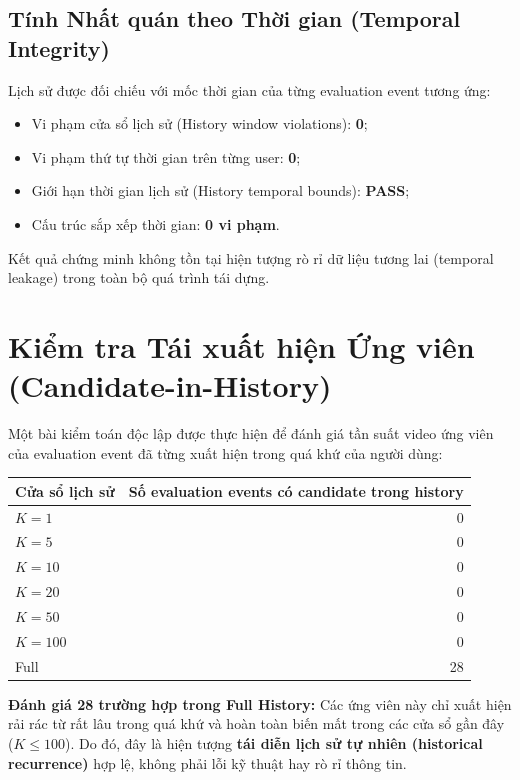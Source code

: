 \documentclass[12pt,a4paper]{article}
\begin{document}
\subsection{Tính Nhất quán theo Thời gian (Temporal Integrity)}
Lịch sử được đối chiếu với mốc thời gian của từng evaluation event tương ứng:
\begin{itemize}[noitemsep]
    \item Vi phạm cửa sổ lịch sử (History window violations): \textbf{0};
    \item Vi phạm thứ tự thời gian trên từng user: \textbf{0};
    \item Giới hạn thời gian lịch sử (History temporal bounds): \textbf{PASS};
    \item Cấu trúc sắp xếp thời gian: \textbf{0 vi phạm}.
\end{itemize}

Kết quả chứng minh không tồn tại hiện tượng rò rỉ dữ liệu tương lai (temporal leakage) trong toàn bộ quá trình tái dựng.

\section{Kiểm tra Tái xuất hiện Ứng viên (Candidate-in-History)}
Một bài kiểm toán độc lập được thực hiện để đánh giá tần suất video ứng viên của evaluation event đã từng xuất hiện trong quá khứ của người dùng:
\begin{center}
\begin{tabular}{lr}
\toprule
\textbf{Cửa sổ lịch sử} & \textbf{Số evaluation events có candidate trong history} \\
\midrule
$K=1$   & 0 \\
$K=5$   & 0 \\
$K=10$  & 0 \\
$K=20$  & 0 \\
$K=50$  & 0 \\
$K=100$ & 0 \\
Full    & 28 \\
\bottomrule
\end{tabular}
\end{center}

\noindent\textbf{Đánh giá 28 trường hợp trong Full History:} Các ứng viên này chỉ xuất hiện rải rác từ rất lâu trong quá khứ và hoàn toàn biến mất trong các cửa sổ gần đây ($K \le 100$). Do đó, đây là hiện tượng \textbf{tái diễn lịch sử tự nhiên (historical recurrence)} hợp lệ, không phải lỗi kỹ thuật hay rò rỉ thông tin.
\end{document}
